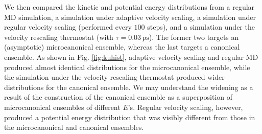 \documentclass[reprint]{revtex4-1}
\newcommand{\note}[1]{{\color{DarkGreen}\footnotesize \textsc{Note.} #1}}
\begin{document}



We then compared the kinetic and potential energy
distributions from a regular MD simulation,
a simulation under adaptive velocity scaling,
a simulation under regular velocity scaling (performed every $100$ steps),
and
a simulation under the velocity rescaling
thermostat\cite{bussi2007}
(with $\tau = 0.03 \, \mathrm{ps}$).
%
The former two targets an (asymptotic) microcanonical ensemble,
whereas the last targets a canonical ensemble.
%
As shown in Fig. \ref{fig:kuhist},
adaptive velocity scaling and regular MD
produced almost identical distributions for the microcanonical ensemble,
while the simulation under the velocity rescaling thermostat
produced wider distributions for the canonical ensemble.
%
We may understand the widening %
as a result of the construction of the canonical ensemble
as a superposition of microcanonical ensembles of different $E$'s.
%
Regular velocity scaling, however, produced
a potential energy distribution that
was visibly different from
those in the microcanonical and canonical ensembles.
%
\end{document}
